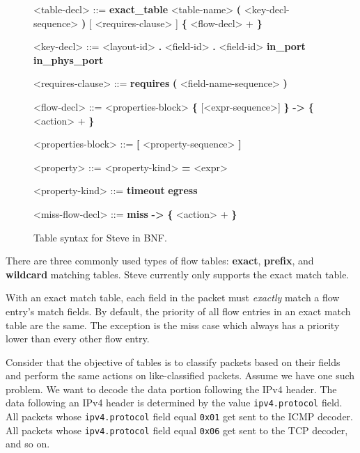 \begin{figure}[ht]
\begin{mdframed}
\begin{grammar}
<table-decl> ::=
\textbf{exact\_table} <table-name> \textbf{(} <key-decl-sequence> \textbf{)} 
[ <requires-clause> ]
\textbf{\{} 
<flow-decl> + 
\textbf{\}}

<key-decl> ::=
<layout-id> \textbf{.} <field-id>
 \textbf{.} <field-id>
\alt \textbf{in\_port}
\alt \textbf{in\_phys\_port}

<requires-clause> ::=
\textbf{requires} \textbf{(} <field-name-sequence> \textbf{)}

<flow-decl> ::=
<properties-block>
\textbf{\{} [<expr-sequence>] \textbf{\}} \textbf{-\textgreater}
\textbf{\{} 
<action> +
\textbf{\}}

<properties-block> ::=
\textbf{[} <property-sequence> \textbf{]}

<property> ::=
<property-kind> \textbf{=} <expr>

<property-kind> ::=
\textbf{timeout}
\alt \textbf{egress}

<miss-flow-decl> ::=
\textbf{miss} \textbf{-\textgreater}
\textbf{\{} 
<action> +
\textbf{\}}
\end{grammar}
\end{mdframed}
\caption{Table syntax for Steve in BNF.}
\label{fg:table_syntax}
\end{figure}

There are three commonly used types of flow tables: \textbf{exact}, \textbf{prefix}, and \textbf{wildcard} matching tables. Steve currently only supports the exact match table. 

With an exact match table, each field in the packet must \textit{exactly} match a flow entry's match fields. By default, the priority of all flow entries in an exact match table are the same. The exception is the miss case which always has a priority lower than every other flow entry.

Consider that the objective of tables is to classify packets based on their fields and perform the same actions on like-classified packets. Assume we have one such problem. We want to decode the data portion following the IPv4 header. The data following an IPv4 header is determined by the value \texttt{ipv4.protocol} field. All packets whose \texttt{ipv4.protocol} field equal \texttt{0x01} get sent to the ICMP decoder. All packets whose \texttt{ipv4.protocol} field equal \texttt{0x06} get sent to the TCP decoder, and so on.

